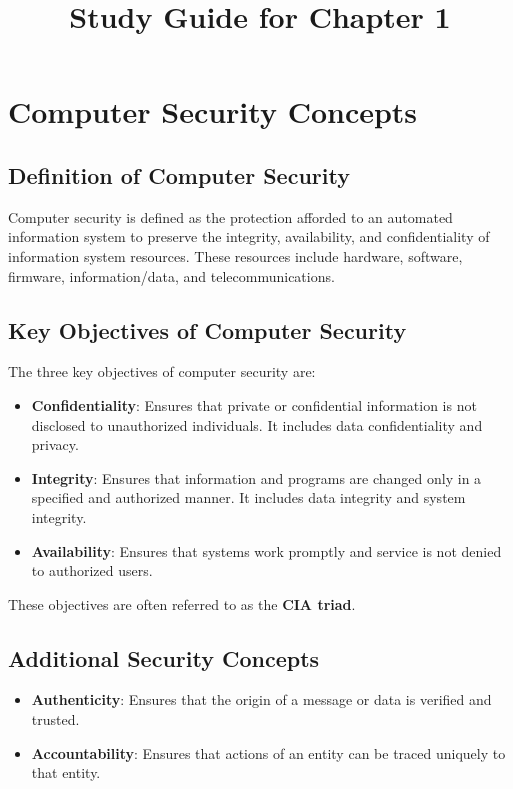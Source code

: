 \documentclass{article}
\title{Study Guide for Chapter 1}
\begin{document}
\maketitle

\section{Computer Security Concepts}
\subsection{Definition of Computer Security}
Computer security is defined as the protection afforded to an automated information system to preserve the integrity, availability, and confidentiality of information system resources. These resources include hardware, software, firmware, information/data, and telecommunications.

\subsection{Key Objectives of Computer Security}
The three key objectives of computer security are:
\begin{itemize}
    \item \textbf{Confidentiality}: Ensures that private or confidential information is not disclosed to unauthorized individuals. It includes data confidentiality and privacy.
    \item \textbf{Integrity}: Ensures that information and programs are changed only in a specified and authorized manner. It includes data integrity and system integrity.
    \item \textbf{Availability}: Ensures that systems work promptly and service is not denied to authorized users.
\end{itemize}

These objectives are often referred to as the \textbf{CIA triad}.

\subsection{Additional Security Concepts}
\begin{itemize}
    \item \textbf{Authenticity}: Ensures that the origin of a message or data is verified and trusted.
    \item \textbf{Accountability}: Ensures that actions of an entity can be traced uniquely to that entity.
\end{itemize}
\end{document}
